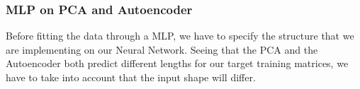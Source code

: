 


\subsubsection{	MLP on PCA and Autoencoder}

Before fitting the data through a MLP, we have to specify the structure that we are implementing on our Neural Network. Seeing that the PCA and the Autoencoder both predict different lengths for our target training matrices, we have to take into account that the input shape will differ. \par

